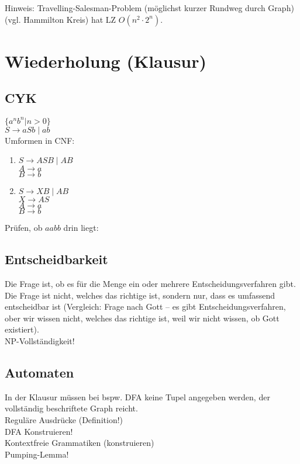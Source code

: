 \documentclass{scrreprt}
\begin{document}
Hinweis: Travelling-Salesman-Problem (möglichst kurzer Rundweg durch Graph) (vgl. Hammilton Kreis) hat LZ $O(n^2\cdot 2^n)$.

\section{Wiederholung (Klausur)}
\subsection{CYK}
$\{a^nb^n|n>0\}$\\
$S\to aSb \;|\; ab$\\
Umformen in CNF:
\begin{enumerate}
\item $S\to ASB \;|\; AB$\\
$A\to a$\\
$B\to b$
\item $S\to XB \;|\; AB$\\
$X\to AS$\\
$A \to a$\\
$B \to b$
\end{enumerate}
Prüfen, ob $aabb$ drin liegt:\\
\subsection{Entscheidbarkeit}
Die Frage ist, ob es für die Menge ein oder mehrere Entscheidungsverfahren gibt. Die Frage ist nicht, welches das richtige ist, sondern nur, dass es umfassend entscheidbar ist (Vergleich: Frage nach Gott -- es gibt Entscheidungsverfahren, ober wir wissen nicht, welches das richtige ist, weil wir nicht wissen, ob Gott existiert).\\
NP-Vollständigkeit!

\subsection{Automaten}
In der Klausur müssen bei bspw. DFA keine Tupel angegeben werden, der vollständig beschriftete Graph reicht.\\
Reguläre Ausdrücke (Definition!)\\
DFA Konstruieren!\\
Kontextfreie Grammatiken (konstruieren)\\
Pumping-Lemma!
\end{document}
